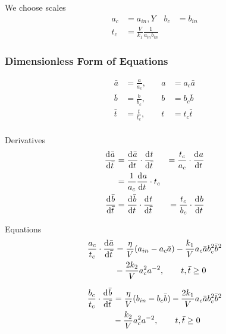 \documentclass[12pt]{article}
\begin{document}
  We choose scales
  \begin{equation}
    \begin{aligned}
      a_c &= a_{in}, Y\quad b_c &= b_{in} \\
      t_c &= \frac{V}{k_1}\frac{1}{a_{in}b_{in}}
    \end{aligned}
  \end{equation}

  \subsubsection{Dimensionless Form of Equations}
  \begin{equation}
    \begin{aligned}
      \bar{a} &= \frac{a}{a_c}, &\quad a &= a_c\bar{a} \\
      \bar{b} &= \frac{b}{b_c}, &\quad b &= b_c\bar{b} \\
      \bar{t} &= \frac{t}{t_c}, &\quad t &= t_c\bar{t} \\
    \end{aligned}
  \end{equation}

  Derivatives
  \begin{equation}
    \begin{aligned}
      \frac{\mathrm{d}^{} {\bar{a}}}{\mathrm{d}{\bar{t}}^{}} &= \frac{\mathrm{d}^{} {\bar{a}}}{\mathrm{d}{t}^{}} \cdot \frac{\mathrm{d}^{} {t}}{\mathrm{d}{\bar{t}}^{}} &= \frac{t_c}{a_c}\cdot\frac{\mathrm{d}^{} {a}}{\mathrm{d}{t}^{}} \\
      &= \frac{1}{a_c}\frac{\mathrm{d}^{} {a}}{\mathrm{d}{t}^{}} \cdot t_c \\
      \frac{\mathrm{d}^{} {\bar{b}}}{\mathrm{d}{\bar{t}}^{}} &= \frac{\mathrm{d}^{} {\bar{b}}}{\mathrm{d}{t}^{}} \cdot \frac{\mathrm{d}^{} {t}}{\mathrm{d}{\bar{t}}^{}} &= \frac{t_c}{b_c}\cdot\frac{\mathrm{d}^{} {b}}{\mathrm{d}{t}^{}} \\
    \end{aligned}
  \end{equation}

  Equations
  \begin{equation}
    \begin{aligned}
      \frac{a_c}{t_c}\cdot\frac{\mathrm{d}^{} {\bar{a}}}{\mathrm{d}{\bar{t}}^{}} &= \frac{\eta}{V}(a_{in}-a_c\bar{a})-\frac{k_1}{V}a_c\bar{a}b_c^2\bar{b}^2 \\
      &- \frac{2k_2}{V}a_c^2a^{-2},\qquad t,\bar{t}\ge 0 \\
    \end{aligned}
  \end{equation}

    \begin{equation}
    \begin{aligned}
      \frac{b_c}{t_c}\cdot\frac{\mathrm{d}^{} {\bar{b}}}{\mathrm{d}{\bar{t}}^{}} &= \frac{\eta}{V}(b_{in}-b_c\bar{b})-\frac{2k_1}{V}a_c\bar{a}b_c^2\bar{b}^2 \\
      &- \frac{k_2}{V}a_c^2a^{-2},\qquad t,\bar{t}\ge 0 \\
    \end{aligned}
  \end{equation}
\end{document}
